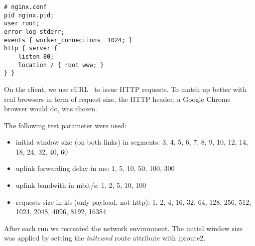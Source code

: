 \begin{lstlisting}
# nginx.conf
pid nginx.pid;
user root;
error_log stderr;
events { worker_connections  1024; }
http { server {
    listen 80;
    location / { root www; }
} }
\end{lstlisting}

On the client, we use cURL~\cite{curl} to issue HTTP requests. To match up
better with real browsers in term of request size, the HTTP header, a Google
Chrome browser would do, was chosen.

The following test parameter were used:

\begin{itemize}
  \item initial window size (on both links) in segments: 3, 4, 5, 6, 7, 8, 9, 10, 12, 14, 18, 24, 32, 40, 60
  \item uplink forwarding delay in ms: 1, 5, 10, 50, 100, 300
  \item uplink bandwith in mbit/s: 1, 2, 5, 10, 100
  \item requests size in kb (only payload, not http): 1, 2, 4, 16, 32, 64, 128, 256, 512, 1024, 2048, 4096, 8192, 16384
\end{itemize}

After each run we recreated the network environment. The initial window size was
applied by setting the \emph{initcwnd} route attribute with iproute2.


%
%
